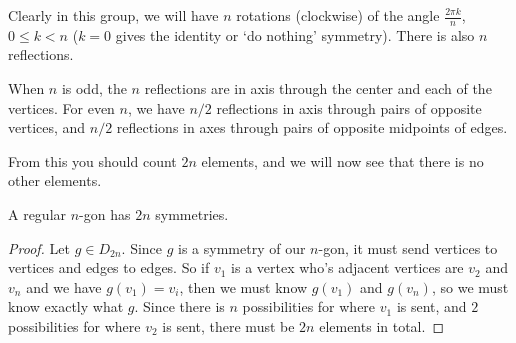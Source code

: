 \documentclass[a4]{scrreprt}
\begin{document}
Clearly in this group, we will have $n$ rotations (clockwise) of the angle $\frac{2 \pi k}{n}$, $0 \leq k < n$ ($k = 0$ gives the identity or `do nothing' symmetry). There is also $n$ reflections.
\begin{center}
	


\end{center}
When $n$ is odd, the $n$ reflections are in axis through the center and each of the vertices. For even $n$, we have $n/2$ reflections in axis through pairs of opposite vertices, and $n / 2$ reflections in axes through pairs of opposite midpoints of edges.

From this you should count $2n$ elements, and we will now see that there is no other elements.

\begin{proposition}
	A regular $n$-gon has $2n$ symmetries.
\end{proposition}
\begin{proof}
	Let $g \in D_{2n}$. Since $g$ is a symmetry of our $n$-gon, it must send vertices to vertices and edges to edges. So if $v_1$ is a vertex who's adjacent vertices are $v_2$ and $v_n$ and we have $g(v_1) = v_i$, then we must know $g(v_1)$ and $g(v_n)$, so we must know exactly what $g$. Since there is $n$ possibilities for where $v_1$ is sent, and $2$ possibilities for where $v_2$ is sent, there must be $2n$ elements in total.
\end{proof}
\end{document}
